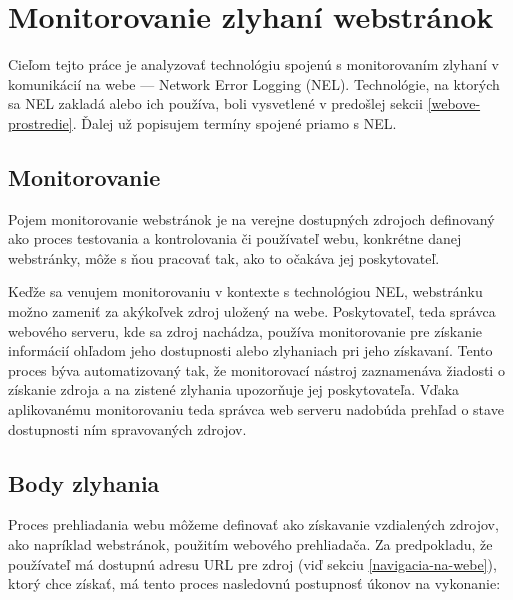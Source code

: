 
\section{Monitorovanie zlyhaní webstránok}

Cieľom tejto práce je analyzovať technológiu spojenú s monitorovaním zlyhaní v komunikácií 
na webe --- Network Error Logging (NEL).
Technológie, na ktorých sa NEL zakladá alebo ich používa, boli vysvetlené v predošlej sekcii \ref{webove-prostredie}.
Ďalej už popisujem termíny spojené priamo s NEL.

\subsection{Monitorovanie}
\label{monitorovanie}

Pojem monitorovanie webstránok je na verejne dostupných zdrojoch definovaný ako proces testovania a kontrolovania či používateľ webu, konkrétne danej webstránky, môže s ňou pracovať tak, ako to očakáva jej poskytovateľ. 

Keďže sa venujem monitorovaniu v kontexte s technológiou NEL, webstránku možno zameniť za akýkoľvek zdroj uložený na webe.
Poskytovateľ, teda správca webového serveru, kde sa zdroj nachádza, používa monitorovanie pre získanie informácií ohľadom jeho dostupnosti alebo zlyhaniach pri jeho získavaní.
Tento proces býva automatizovaný tak, že monitorovací nástroj zaznamenáva žiadosti o získanie zdroja a na zistené zlyhania upozorňuje jej poskytovateľa.  
Vďaka aplikovanému monitorovaniu teda správca web serveru nadobúda prehľad o stave dostupnosti ním spravovaných zdrojov.


\pagebreak

\subsection{Body zlyhania}
\label{body-zlyhania}

Proces prehliadania webu môžeme definovať ako získavanie vzdialených zdrojov, ako napríklad webstránok, použitím webového prehliadača.
Za predpokladu, že používateľ má dostupnú adresu URL pre zdroj (viď sekciu \ref{navigacia-na-webe}), 
ktorý chce získať, má tento proces nasledovnú postupnosť úkonov na vykonanie:

